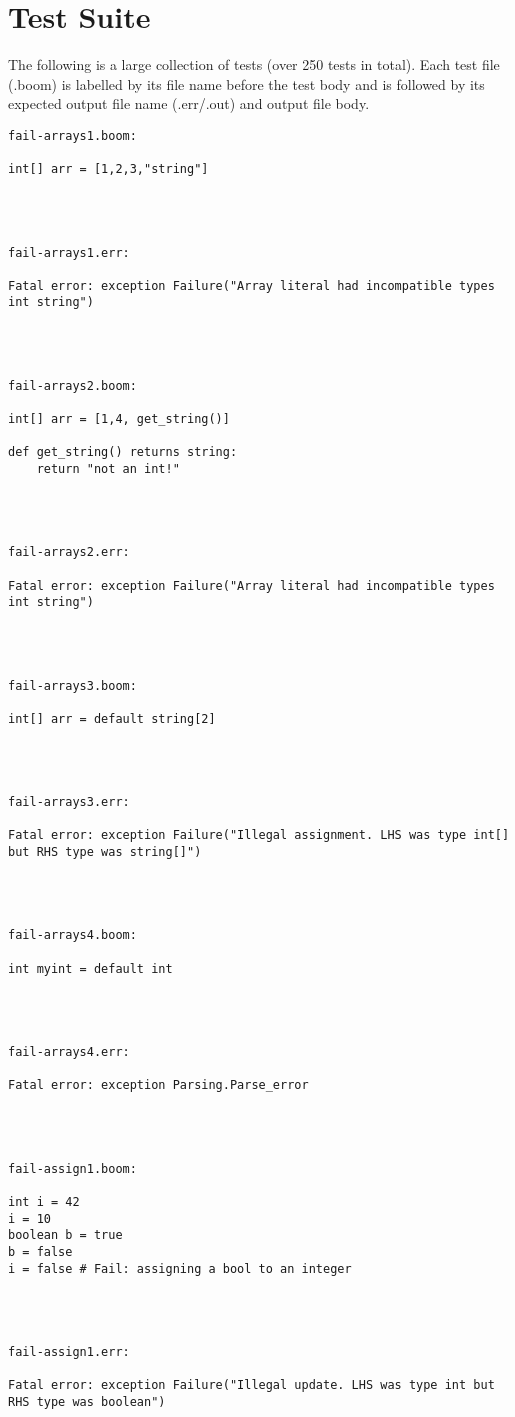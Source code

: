 \documentclass{article}
\begin{document}
\section{Test Suite}
\label{sec:testsuite}
The following is a large collection of tests (over 250 tests in total). Each test file (.boom) is labelled by its file name before the test body and is followed by its expected output file name (.err/.out) and output file body.

\begin{verbatim}
fail-arrays1.boom: 

int[] arr = [1,2,3,"string"]




fail-arrays1.err: 

Fatal error: exception Failure("Array literal had incompatible types int string")




fail-arrays2.boom: 

int[] arr = [1,4, get_string()]

def get_string() returns string:
	return "not an int!"




fail-arrays2.err: 

Fatal error: exception Failure("Array literal had incompatible types int string")




fail-arrays3.boom: 

int[] arr = default string[2]




fail-arrays3.err: 

Fatal error: exception Failure("Illegal assignment. LHS was type int[] but RHS type was string[]")




fail-arrays4.boom: 

int myint = default int




fail-arrays4.err: 

Fatal error: exception Parsing.Parse_error




fail-assign1.boom: 

int i = 42
i = 10
boolean b = true
b = false
i = false # Fail: assigning a bool to an integer




fail-assign1.err: 

Fatal error: exception Failure("Illegal update. LHS was type int but RHS type was boolean")





\end{verbatim}
\end{document}

